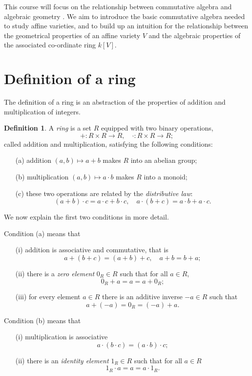 \documentclass [12pt,oneside,a4paper,mathscr]{amsart}
\theoremstyle{definition}
\newtheorem{defn}[thm]{Definition}
\begin{document}
This course will focus on the relationship between commutative algebra and algebraic geometry .  We aim to introduce the basic commutative algebra needed to study affine varieties, and to build up an intuition for the relationship between the geometrical properties of an affine variety $V$  and the algebraic properties of the associated co-ordinate ring $k[V]$.



\section{Definition of a ring}

The definition of a ring is an abstraction of the properties of addition and multiplication of integers.

\begin{defn}
A \emph{ring} is a set $R$ equipped with two binary operations,
\[+\colon R\times R\to R, \quad \cdot \colon R\times R \to R;\] 
called addition and multiplication, satisfying the following conditions:
\begin{itemize}
\item[(a)] addition $(a,b)\mapsto a+b$ makes $R$ into an abelian group;\smallskip
\item[(b)] multiplication $(a,b)\mapsto a\cdot b$ makes $R$ into a monoid;\smallskip
\item[(c)] these two operations are related by the \emph{distributive law}:
\[(a+b)\cdot c = a\cdot c+ b\cdot c, \quad a\cdot (b+c) = a\cdot b + a\cdot c. \]
\end{itemize}
\end{defn}

We now explain the  first two conditions in more detail.
\smallskip

Condition (a) means that

\begin{itemize}
\item[(i)]  addition is associative and commutative, that is
\[a+(b+c) = (a+b)+c, \quad a+b=b+a;\]
\item[(ii)]
there is a \emph{zero element} $0_R\in R$ such that for all $a\in R$, 
\[0_R+a=a=a+0_R;\]
\item[(iii)] for every element $a\in R$ there is an additive inverse  $-a\in R$ such that
\[a+(-a) = 0_R = (-a) + a.\]\end{itemize}
\smallskip

Condition (b) means that
\begin{itemize}
\item[(i)]multiplication is associative
\[a\cdot (b\cdot c) = (a\cdot b)\cdot c;\]
\item[(ii)] there is an \emph{identity element} $1_R\in R$ such that for all $a\in R$
\[1_R\cdot a = a = a\cdot 1_R.\]
\end{itemize}
\end{document}
